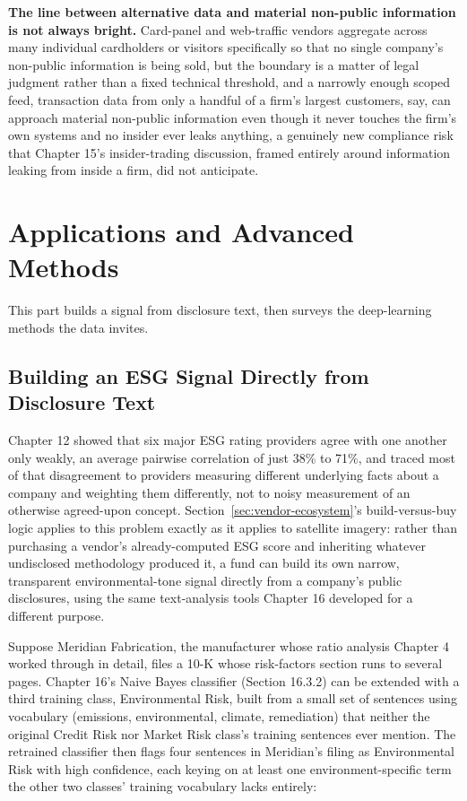 \documentclass[../ai_in_finance]{subfiles}
\begin{document}
\textbf{The line between alternative data and material non-public information is not always bright.} Card-panel and web-traffic vendors aggregate across many individual cardholders or visitors specifically so that no single company's non-public information is being sold, but the boundary is a matter of legal judgment rather than a fixed technical threshold, and a narrowly enough scoped feed, transaction data from only a handful of a firm's largest customers, say, can approach material non-public information even though it never touches the firm's own systems and no insider ever leaks anything, a genuinely new compliance risk that Chapter 15's insider-trading discussion, framed entirely around information leaking from inside a firm, did not anticipate.

\section{Applications and Advanced Methods}

This part builds a signal from disclosure text, then surveys the deep-learning methods the data invites.

\subsection{Building an ESG Signal Directly from Disclosure Text}
\label{sec:esg-text-signal}

Chapter 12 showed that six major ESG rating providers agree with one another only weakly, an average pairwise correlation of just 38\% to 71\%, and traced most of that disagreement to providers measuring different underlying facts about a company and weighting them differently, not to noisy measurement of an otherwise agreed-upon concept. Section~\ref{sec:vendor-ecosystem}'s build-versus-buy logic applies to this problem exactly as it applies to satellite imagery: rather than purchasing a vendor's already-computed ESG score and inheriting whatever undisclosed methodology produced it, a fund can build its own narrow, transparent environmental-tone signal directly from a company's public disclosures, using the same text-analysis tools Chapter 16 developed for a different purpose.

Suppose Meridian Fabrication, the manufacturer whose ratio analysis Chapter 4 worked through in detail, files a 10-K whose risk-factors section runs to several pages. Chapter 16's Naive Bayes classifier (Section 16.3.2) can be extended with a third training class, Environmental Risk, built from a small set of sentences using vocabulary (emissions, environmental, climate, remediation) that neither the original Credit Risk nor Market Risk class's training sentences ever mention. The retrained classifier then flags four sentences in Meridian's filing as Environmental Risk with high confidence, each keying on at least one environment-specific term the other two classes' training vocabulary lacks entirely:
\end{document}
